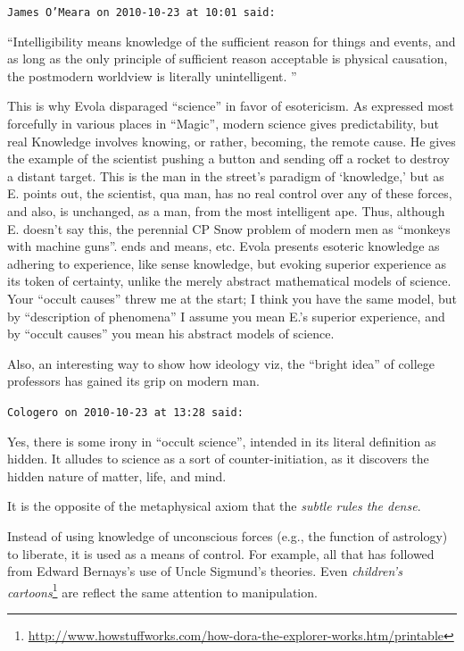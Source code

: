 \begin{footnotesize}
\begin{sffamily}
\texttt{James O'Meara on 2010-10-23 at 10:01 said:}

``Intelligibility means knowledge of the sufficient reason for things and events, and as long as the only principle of sufficient reason acceptable is physical causation, the postmodern worldview is literally unintelligent. ''

This is why Evola disparaged ``science'' in favor of esotericism. As expressed most forcefully in various places in ``Magic'', modern science gives predictability, but real Knowledge involves knowing, or rather, becoming, the remote cause. He gives the example of the scientist pushing a button and sending off a rocket to destroy a distant target. This is the man in the street's paradigm of `knowledge,' but as E. points out, the scientist, qua man, has no real control over any of these forces, and also, is unchanged, as a man, from the most intelligent ape. Thus, although E. doesn't say this, the perennial CP Snow problem of modern men as ``monkeys with machine guns''. ends and means, etc. Evola presents esoteric knowledge as adhering to experience, like sense knowledge, but evoking superior experience as its token of certainty, unlike the merely abstract mathematical models of science. Your ``occult causes'' threw me at the start; I think you have the same model, but by ``description of phenomena'' I assume you mean E.'s superior experience, and by ``occult causes'' you mean his abstract models of science.

Also, an interesting way to show how ideology viz, the ``bright idea'' of college professors has gained its grip on modern man.

\hfill

\texttt{Cologero on 2010-10-23 at 13:28 said:}

Yes, there is some irony in ``occult science'', intended in its literal definition as hidden. It alludes to science as a sort of counter-initiation, as it discovers the hidden nature of matter, life, and mind.

It is the opposite of the metaphysical axiom that the \emph{subtle rules the dense}.

Instead of using knowledge of unconscious forces (e.g., the function of astrology) to liberate, it is used as a means of control. For example, all that has followed from Edward Bernays's use of Uncle Sigmund's theories. Even \textit{children's cartoons}\footnote{\url{http://www.howstuffworks.com/how-dora-the-explorer-works.htm/printable}} are reflect the same attention to manipulation.


\end{sffamily}
\end{footnotesize}
